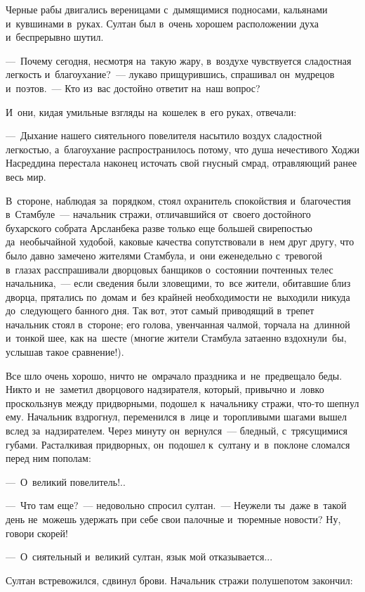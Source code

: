 \documentclass[12pt,a4paper]{book}
\begin{document}
Черные рабы двигались вереницами с~дымящимися подносами, кальянами и~кувшинами в~руках. Султан был в~очень хорошем расположении духа и~беспрерывно шутил.

—~Почему сегодня, несмотря на~такую жару, в~воздухе чувствуется сладостная легкость и~благоухание?~— лукаво прищурившись, спрашивал он~мудрецов и~поэтов.~— Кто из~вас достойно ответит на~наш вопрос?

И~они, кидая умильные взгляды на~кошелек в~его руках, отвечали:

—~Дыхание нашего сиятельного повелителя насытило воздух сладостной легкостью, а~благоухание распространилось потому, что душа нечестивого Ходжи Насреддина перестала наконец источать свой гнусный смрад, отравляющий ранее весь мир.

В~стороне, наблюдая за~порядком, стоял охранитель спокойствия и~благочестия в~Стамбуле~— начальник стражи, отличавшийся от~своего достойного бухарского собрата Арсланбека разве только еще большей свирепостью да~необычайной худобой, каковые качества сопутствовали в~нем друг другу, что было давно замечено жителями Стамбула, и~они еженедельно с~тревогой в~глазах расспрашивали дворцовых банщиков о~состоянии почтенных телес начальника,~— если сведения были зловещими, то~все жители, обитавшие близ дворца, прятались по~домам и~без крайней необходимости не~выходили никуда до~следующего банного дня. Так вот, этот самый приводящий в~трепет начальник стоял в~стороне; его голова, увенчанная чалмой, торчала на~длинной и~тонкой шее, как на~шесте (многие жители Стамбула затаенно вздохнули~бы, услышав такое сравнение!).

Все шло очень хорошо, ничто не~омрачало праздника и~не~предвещало беды. Никто и~не~заметил дворцового надзирателя, который, привычно и~ловко проскользнув между придворными, подошел к~начальнику стражи, что-то шепнул ему. Начальник вздрогнул, переменился в~лице и~торопливыми шагами вышел вслед за~надзирателем. Через минуту он~вернулся~— бледный, с~трясущимися губами. Расталкивая придворных, он~подошел к~султану и~в~поклоне сломался перед ним пополам:

—~О~великий повелитель!..

—~Что там еще?~— недовольно спросил султан.~— Неужели ты~даже в~такой день не~можешь удержать при себе свои палочные и~тюремные новости? Ну, говори скорей!

—~О~сиятельный и~великий султан, язык мой отказывается...

Султан встревожился, сдвинул брови. Начальник стражи полушепотом закончил:
\end{document}

